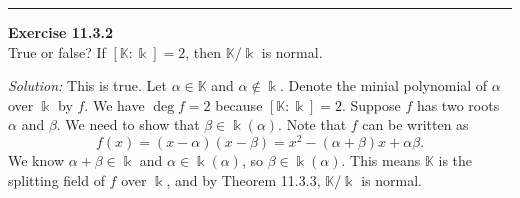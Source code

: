 \documentclass[a4paper, 12pt]{article}
\newenvironment{problem}[2][Exercise]
    { \begin{mdframed}[backgroundcolor=gray!20] \textbf{#1 #2} \\}
    {  \end{mdframed}}
\newenvironment{solution}
    {\textit{Solution:}}
    {}
\begin{document}
\noindent\rule{7in}{2.8pt}
\begin{problem}{11.3.2}
True or false? If \([\mathbb{K}:\Bbbk]=2\), then \(\mathbb{K}/\Bbbk\) is normal. 
\end{problem}
\begin{solution}
This is true. Let \(\alpha\in \mathbb{K}\) and \(\alpha\notin \Bbbk\). Denote the minial polynomial of \(\alpha\) over \(\Bbbk\) by \(f\). We have \(\deg f=2\) because \([\mathbb{K}:\Bbbk]=2\). Suppose \(f\) has two roots \(\alpha\) and \(\beta\). We need to 
show that \(\beta\in \Bbbk(\alpha)\). Note that \(f\) can be written as 
\[f(x)=(x-\alpha)(x-\beta)=x^2-(\alpha+\beta)x+\alpha\beta.\]
We know \(\alpha+\beta\in \Bbbk\) and \(\alpha\in \Bbbk(\alpha)\), so \(\beta\in \Bbbk(\alpha)\). This means \(\mathbb{K}\) is the splitting field of \(f\) over \(\Bbbk\), and by Theorem 11.3.3, \(\mathbb{K}/\Bbbk\) is normal.
\end{solution}
\end{document}

